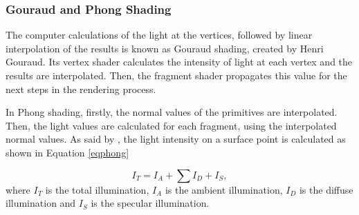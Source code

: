 \documentclass[10pt, conference, compsocconf]{IEEEtran}
\begin{document}
\subsubsection{Gouraud and Phong Shading}
\label{phong}

The computer calculations of the light at the vertices, followed by linear interpolation of the results is known as Gouraud shading, created by Henri Gouraud.
Its vertex shader calculates the intensity of light at each vertex and the results are interpolated. Then, the fragment shader propagates this value for the next steps in the rendering process.

In Phong shading, firstly, the normal values of the primitives are interpolated. Then, the light values are calculated for each fragment, using the interpolated normal values. 
As said by \cite{guha2011}, the light intensity on a surface point is calculated as shown in Equation \ref{eqphong}

	\begin{equation}
	I_ {T} = I_ {A} +  \sum I_ {D} + I_ {S},
	\label{eqphong}
	\end{equation}
	where $I_{T}$ is the total illumination, $I_A$ is the ambient illumination, $I_D$ is the diffuse illumination and  $I_S$ is the specular illumination. 
\end{document}
